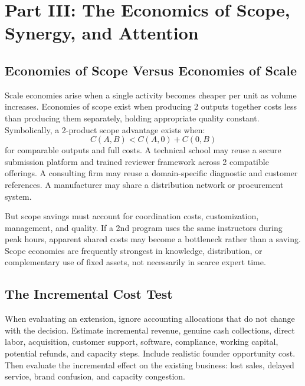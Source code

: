 \section*{Part III: The Economics of Scope, Synergy, and Attention}
\label{sec:part3_economics_of_scope_synergy_attention}

\subsection{Economies of Scope Versus Economies of Scale}
\label{sec:economies_of_scope_vs_scale}

Scale economies arise when a single activity becomes cheaper per unit as volume increases. Economies of scope exist when producing 2 outputs together costs less than producing them separately, holding appropriate quality constant. Symbolically, a 2-product scope advantage exists when:
\begin{equation}
\label{eq:economies_of_scope}
C(A,B) < C(A,0) + C(0,B)
\end{equation}
for comparable outputs and full costs. A technical school may reuse a secure submission platform and trained reviewer framework across 2 compatible offerings. A consulting firm may reuse a domain-specific diagnostic and customer references. A manufacturer may share a distribution network or procurement system.

But scope savings must account for coordination costs, customization, management, and quality. If a 2nd program uses the same instructors during peak hours, apparent shared costs may become a bottleneck rather than a saving. Scope economies are frequently strongest in knowledge, distribution, or complementary use of fixed assets, not necessarily in scarce expert time.

\subsection{The Incremental Cost Test}
\label{sec:incremental_cost_test}

When evaluating an extension, ignore accounting allocations that do not change with the decision. Estimate incremental revenue, genuine cash collections, direct labor, acquisition, customer support, software, compliance, working capital, potential refunds, and capacity steps. Include realistic founder opportunity cost. Then evaluate the incremental effect on the existing business: lost sales, delayed service, brand confusion, and capacity congestion.

